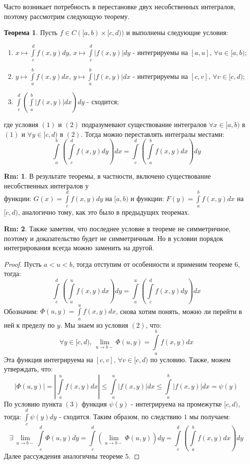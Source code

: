 \documentclass[12pt]{article}
\theoremstyle{definition}
\newtheorem{rem}{Rm:}
\newtheorem{theorem}{Теорема}
\newcommand{\ddint}[2]{\displaystyle\int\limits_{#1}^{#2}}
\begin{document}
Часто возникает потребность в перестановке двух несобственных интегралов, поэтому рассмотрим следующую теорему.
\begin{theorem}
	Пусть $f \in C([a,b)\times [c,d))$ и выполнены следующие условия:
	\begin{enumerate}[label=(\arabic*)]
		\item $x \mapsto \ddint{c}{d}f(x,y)dy$, $x \mapsto \ddint{c}{d}|f(x,y)|dy$ - интегрируемы на $[a,u], \, \forall u \in [a,b)$;
		\item $y \mapsto \ddint{a}{b}f(x,y)dx$, $y \mapsto \ddint{a}{b}|f(x,y)|dx$ - интегрируемы на $[c,v], \, \forall v \in [c,d)$;
		\item $\ddint{c}{d}\left(\ddint{a}{b}|f(x,y)|dx\right)dy$ - сходится;
	\end{enumerate}
	где условия $(1)$ и $(2)$ подразумевают существование интегралов $\forall x\in [a,b)$ в $(1)$ и $\forall y \in [c,d)$ в $(2)$. Тогда можно переставлять интегралы местами:
	$$
		\ddint{a}{b}\left(\ddint{c}{d}f(x,y)dy\right)dx = \ddint{c}{d}\left(\ddint{a}{b}f(x,y)dx\right)dy
	$$
\end{theorem}
\begin{rem}
	В результате теоремы, в частности, включено существование несобственных интегралов у \\ функции: $G(x) = \ddint{c}{d}f(x,y)dy$ на $[a,b)$ и функции: $F(y) = \ddint{a}{b}f(x,y)dx$ на $[c,d)$, аналогично тому, как это было в предыдущих теоремах.
\end{rem}
\begin{rem}
	Также заметим, что последнее условие в теореме не симметричное, поэтому и доказательство будет не симметричным. Но в условии порядок интегрирования всегда можно заменить на другой.
\end{rem}
\begin{proof}
	Пусть $a < u < b$, тогда отступим от особенности и применим теореме $6$, тогда:
	$$
		\ddint{c}{d}\left(\ddint{a}{u}f(x,y)dx\right)dy = \ddint{a}{u}\left(\ddint{c}{d}f(x,y)dy\right)dx
	$$
	Обозначим: $\Phi(u,y) = \ddint{a}{u}f(x,y)dx$, снова хотим понять, можно ли перейти в ней к пределу по $y$. Мы знаем из условия $(2)$, что: 
	$$
		\forall y \in [c,d), \, \lim\limits_{u \to b-}\Phi(u,y) = \ddint{a}{b}f(x,y)dx
	$$ 
	Эта функция интегрируема на $[c,v], \, \forall v \in [c,d)$ по условию. Также, можем утверждать, что: 
	$$
		|\Phi(u,y)|= \left|\ddint{a}{u}f(x,y)dx\right| \leq \ddint{a}{u}|f(x,y)|dx \leq \ddint{a}{b}|f(x,y)|dx = \psi(y)
	$$
	По условию пункта $(3)$ функция $\psi(y)$ - интегрируема на промежутке $[c,d)$, тогда: $\ddint{c}{d}\psi(y)dy$ - сходится. Таким образом, по следствию $1$ мы получаем:
	$$
		\exists \, \lim\limits_{u \to b-}\ddint{c}{d}\Phi(u,y)dy = \ddint{c}{d}\left(\lim\limits_{u \to b-}\Phi(u,y)\right)dy = \ddint{c}{d}\left(\ddint{a}{b}f(x,y)dx\right)dy
	$$
	Далее рассуждения аналогичны теореме $5$.
\end{proof}
\end{document}
